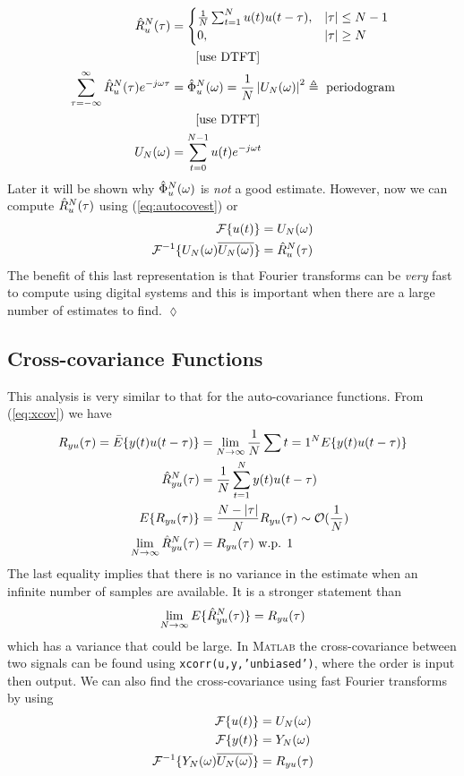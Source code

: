 \begin{example}
\begin{align*}
\hat{R}_u^N(\tau) &= \begin{cases} \frac{1}{N}\sum_{t=1}^Nu(t)u(t-\tau), & |\tau|\leq N-1 \\ 0, & |\tau|\geq N \end{cases} \\
&\qquad[\text{use DTFT}] \\
\sum_{\tau=-\infty}^\infty\hat{R}_u^N(\tau) e^{-j\omega\tau} &= \hat{\Phi}_u^N(\omega) = \frac{1}{N}\left|U_N(\omega)\right|^2 \triangleq \text{ periodogram} \\
&\qquad[\text{use DTFT}] \\
U_N(\omega) &= \sum_{t=0}^{N-1}u(t)e^{-j\omega t}
\end{align*}
Later it will be shown why $\hat{\Phi}_u^N(\omega)$ is \textit{not} a good estimate. However, now we can compute $\hat{R}_u^N(\tau)$ using (\ref{eq:autocovest}) or
\begin{align*}
\mathcal{F}\{u(t)\} &= U_N(\omega) \\
\mathcal{F}^{-1}\{U_N(\omega)\overline{U_N(\omega)}\} &= \hat{R}_u^N(\tau)
\end{align*}
The benefit of this last representation is that Fourier transforms can be \textit{very} fast to compute using digital systems and this is important when there are a large number of estimates to find.
$\lozenge$
\end{example}

\subsection{Cross-covariance Functions}
This analysis is very similar to that for the auto-covariance functions. From (\ref{eq:xcov}) we have
\begin{align*}
R_{yu}(\tau) = \bar{E}\{y(t)u(t-\tau)\} &= \lim_{N\to\infty}\frac{1}{N}\sum{t=1}^N E\{y(t)u(t-\tau)\} \\
\hat{R}_{yu}^N(\tau) &= \frac{1}{N}\sum_{t=1}^Ny(t)u(t-\tau) \\
E\{R_{yu}(\tau)\} &= \frac{N-|\tau|}{N}R_{yu}(\tau) \sim \mathcal{O}(\frac{1}{N}) \\
\lim_{N\to\infty}\hat{R}_{yu}^N(\tau) &= R_{yu}(\tau) \text{ w.p. } 1
\end{align*}
The last equality implies that there is no variance in the estimate when an infinite number of samples are available. It is a stronger statement than
$$\lim_{N\to\infty}E\{\hat{R}_{yu}^N(\tau)\} = R_{yu}(\tau)$$
which has a variance that could be large. In \textsc{Matlab} the cross-covariance between two signals can be found using \texttt{xcorr(u,y,'unbiased')}, where the order is input then output. We can also find the cross-covariance using fast Fourier transforms by using
\begin{align*}
\mathcal{F}\{u(t)\} &= U_N(\omega) \\
\mathcal{F}\{y(t)\} &= Y_N(\omega) \\
\mathcal{F}^{-1}\{Y_N(\omega)\overline{U_N(\omega)}\} &= R_{yu}(\tau)
\end{align*}

